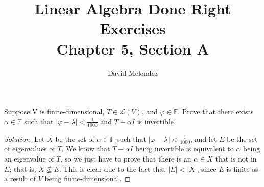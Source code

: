 \documentclass[12pt]{article}
\newenvironment{problem}[2][Problem]{\begin{trivlist}
\item[\hskip \labelsep {\bfseries #1}\hskip \labelsep {\bfseries #2.}]}{\end{trivlist}}
\newenvironment{solution}
  {\renewcommand\qedsymbol{$\blacksquare$}\begin{proof}[Solution]}
{\end{proof}}
\begin{document}
\title{Linear Algebra Done Right Exercises\\ \large Chapter 5, Section A}
\author{David Melendez}
\maketitle

\begin{problem}{13}
  Suppose V is finite-dimensional, $T\in\mathcal{L}(V)$, and $\varphi\in\mathbb{F}$.
  Prove that there exists $\alpha\in\mathbb{F}$ such that 
  $|\varphi-\lambda| < \frac{1}{1000}$
  and $T-\alpha I$ is invertible.
\end{problem}
\begin{solution}
  Let $X$ be the set of $\alpha\in\mathbb{F}$ such that $|\varphi-\lambda| < \frac{1}{1000}$,
  and let $E$ be the set of eigenvalues of $T$.
  We know that $T-\alpha I$ being invertible is equivalent to $\alpha$ being an eigenvalue of $T$,
  so we just have to prove that there is an $\alpha\in X$ that is not in $E$; that is, $X\nsubseteq E$. 
  This is clear due to the fact that $|E| < |X|$, 
  since $E$ is finite as a result of $V$ being finite-dimensional.
\end{solution}
\end{document}
